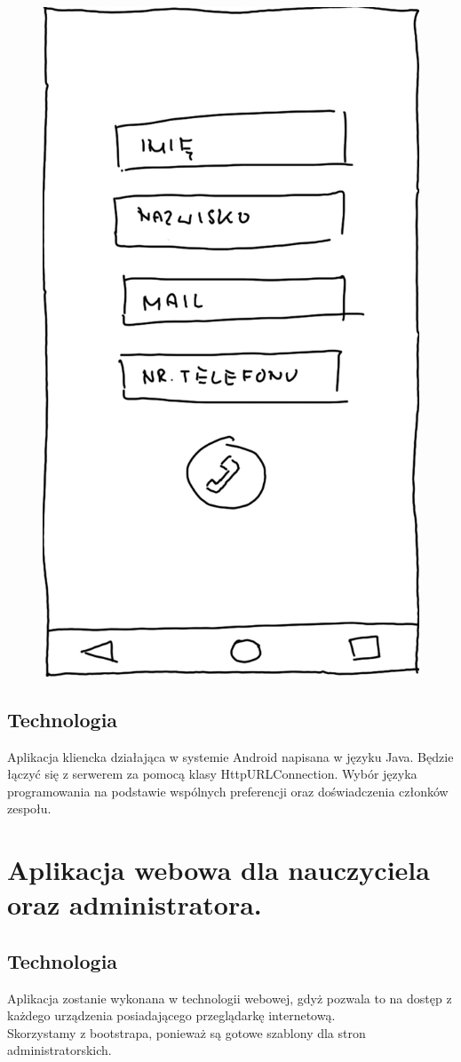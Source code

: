 \documentclass[12pt, titlepage]{article}
\begin{document}
\begin{figure}
\centering
\begin{minipage}{.5\textwidth}
  \centering
  \includegraphics[width=.4\linewidth]{AplikacjaAndroid/Interfejs/Wychowawca.jpg}
  \label{fig:test1}
\end{minipage}%
\end{figure}

\subsection{Technologia}

Aplikacja kliencka działająca w systemie Android napisana w języku Java. Będzie łączyć się z serwerem za pomocą klasy HttpURLConnection. Wybór języka programowania na podstawie wspólnych preferencji oraz doświadczenia członków zespołu.

\section{Aplikacja webowa dla nauczyciela oraz administratora.}
\subsection{Technologia}
Aplikacja zostanie wykonana w technologii webowej, gdyż pozwala to na dostęp z każdego urządzenia posiadającego przeglądarkę internetową. \\
Skorzystamy z  bootstrapa, ponieważ są gotowe szablony dla stron administratorskich.
\end{document}
